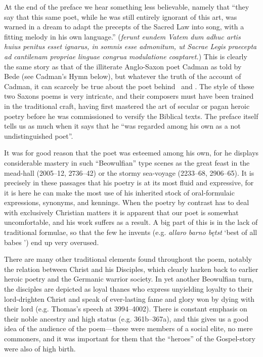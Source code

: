 At the end of the preface we hear something less believable, namely that “they say that this same poet, while he was still entirely ignorant of this art, was warned in a dream to adapt the precepts of the Sacred Law into song, with a fitting melody in his own language.” (\emph{ferunt eundem Vatem dum adhuc artis huius penitus esset ignarus, in somnis esse admonitum, ut Sacrae Legis praecepta ad cantilenam propriae linguae congrua modulatione coaptaret.})  This is clearly the same story as that of the illiterate Anglo-Saxon poet Cadman as told by Bede (see Cadman’s Hymn below), but whatever the truth of the account of Cadman, it can scarcely be true about the poet behind \Heliand\ and \SaxonGenesis.  The style of these two Saxons poems is very intricate, and their composers must have been trained in the traditional craft, having first mastered the art of secular or pagan heroic poetry before he was commissioned to versify the Biblical texts.  The preface itself tells us as much when it says that he “was regarded among his own as a not undistinguished poet”.

It was for good reason that the poet was esteemed among his own, for he displays considerable mastery in such “Beowulfian” type scenes as the great feast in the mead-hall (2005–12, 2736–42) or the stormy sea-voyage (2233–68, 2906–65).  It is precisely in these passages that his poetry is at its most fluid and expressive, for it is here he can make the most use of his inherited stock of oral-formulaic expressions, synonyms, and kennings.  When the poetry by contrast has to deal with exclusively Christian matters it is apparent that our poet is somewhat uncomfortable, and his work suffers as a result.  A big part of this is in the lack of traditional formulae, so that the few he invents (e.g. \emph{allaro barno bętst} ‘best of all babes ’) end up very overused.

There are many other traditional elements found throughout the poem, notably the relation between Christ and his Disciples, which clearly harken back to earlier heroic poetry and the Germanic warrior society.  In yet another Beowulfian turn, the disciples are depicted as loyal thanes who express unyielding loyalty to their lord-drighten Christ and speak of ever-lasting fame and glory won by dying with their lord (e.g. Thomas’s speech at 3994–4002).  There is constant emphasis on their noble ancestry and high status (e.g. 361b–367a), and this gives us a good idea of the audience of the poem—these were members of a social elite, no mere commoners, and it was important for them that the “heroes” of the Gospel-story were also of high birth.

